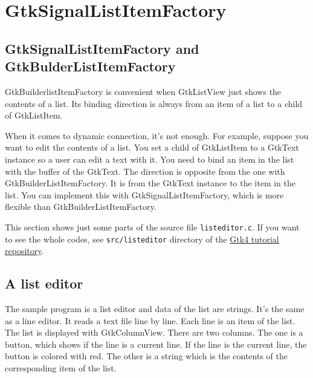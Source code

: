 \section{GtkSignalListItemFactory}\label{gtksignallistitemfactory}

\subsection{GtkSignalListItemFactory and
GtkBulderListItemFactory}\label{gtksignallistitemfactory-and-gtkbulderlistitemfactory}

GtkBuilderlistItemFactory is convenient when GtkListView just shows the
contents of a list. Its binding direction is always from an item of a
list to a child of GtkListItem.

When it comes to dynamic connection, it's not enough. For example,
suppose you want to edit the contents of a list. You set a child of
GtkListItem to a GtkText instance so a user can edit a text with it. You
need to bind an item in the list with the buffer of the GtkText. The
direction is opposite from the one with GtkBuilderListItemFactory. It is
from the GtkText instance to the item in the list. You can implement
this with GtkSignalListItemFactory, which is more flexible than
GtkBuilderListItemFactory.

This section shows just some parts of the source file
\passthrough{\lstinline!listeditor.c!}. If you want to see the whole
codes, see \passthrough{\lstinline!src/listeditor!} directory of the
\href{https://github.com/ToshioCP/Gtk4-tutorial}{Gtk4 tutorial
repository}.

\subsection{A list editor}\label{a-list-editor}

The sample program is a list editor and data of the list are strings.
It's the same as a line editor. It reads a text file line by line. Each
line is an item of the list. The list is displayed with GtkColumnView.
There are two columns. The one is a button, which shows if the line is a
current line. If the line is the current line, the button is colored
with red. The other is a string which is the contents of the
corresponding item of the list.

